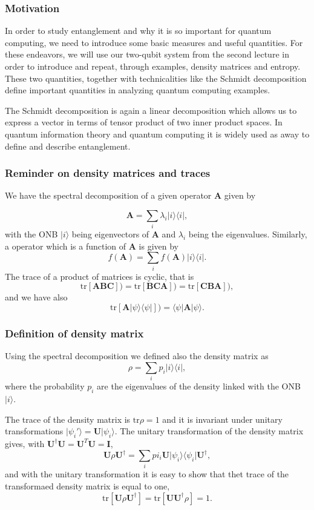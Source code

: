 \documentclass{beamer}
\begin{document}
\begin{frame}
\frametitle{Motivation}

In order to study entanglement and why it is so important for quantum
computing, we need to introduce some basic measures and useful
quantities.  For these endeavors, we  will use our two-qubit system from
the second lecture in order to introduce and repeat, through examples, density
matrices and entropy. These two quantities, together with
technicalities like the Schmidt decomposition define important quantities in analyzing quantum computing examples.

The Schmidt decomposition is again a
linear decomposition which allows us to express a vector in terms of
tensor product of two inner product spaces. In quantum information
theory and quantum computing it is widely used as away to define and
describe entanglement.
\end{frame}

\begin{frame}
\frametitle{Reminder on density matrices and traces}

We have the spectral decomposition of a given operator $\bm{A}$ given by

\[
\bm{A}=\sum_i\lambda_i\vert i \rangle\langle i\vert,
\]
with the ONB $\vert i\rangle$ being eigenvectors of $\bm{A}$ and $\lambda_i$ being the eigenvalues. Similarly, a operator which is a function of $\bm{A}$ is given by
\[
f(\bm{A})=\sum_if(\bm{A})\vert i \rangle\langle i\vert.
\]
The trace of a product of matrices is cyclic, that is
\[
\mathrm{tr}[\bm{ABC}])=\mathrm{tr}[\bm{BCA}])=\mathrm{tr}[\bm{CBA}]),
\]
and we have also 
\[
\mathrm{tr}[\bm{A}\vert \psi\rangle\langle\psi\vert])=\langle\psi\vert\bm{A}\vert\psi\rangle.
\]
\end{frame}

\begin{frame}
\frametitle{Definition of density matrix}

Using the spectral decomposition we defined also the density matrix as
\[
\rho = \sum_i p_i\vert i \rangle\langle i\vert,
\]
where the probability $p_i$ are the eigenvalues of the density linked with the ONB $\vert i \rangle$.

The trace of the density matrix is $\mathrm{tr}\rho=1$ and it is invariant under unitary transformations
$\vert \psi_i'\rangle = \bm{U}\vert \psi_i\rangle$.
The unitary transformation of the density matrix gives, with
$\bm{U}^{\dagger}\bm{U}=\bm{U}^{T}\bm{U}=\bm{I}$,
\[
\bm{U}\rho\bm{U}^{\dagger}=\sum_ipi_i\bm{U}\vert \psi_i\rangle\langle\psi_i\vert\bm{U}^{\dagger},
\]
and with the unitary transformation it is easy to show that thet trace of the transformaed density matrix is equal to one,
\[
\mathrm{tr}\left[ \bm{U}\rho\bm{U}^{\dagger}\right]=\mathrm{tr}\left[ \bm{U}\bm{U}^{\dagger}\rho\right]=1.
\]
\end{frame}
\end{document}
